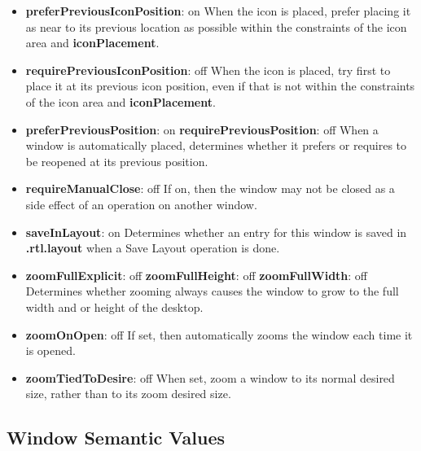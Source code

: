 \begin{itemize}
\item {\bf preferPreviousIconPosition}: on\newline{}
When the icon is placed, prefer placing it as near to its
previous location as possible within the constraints of
the icon area and {\bf iconPlacement}.

\item {\bf requirePreviousIconPosition}: off\newline{}
When the icon is placed, try first to place it at its previous icon
position, even if that is not within the constraints of
the icon area and {\bf iconPlacement}.

\item {\bf preferPreviousPosition}: on\newline{}
{\bf requirePreviousPosition}: off\newline{}
When a window is automatically placed, determines whether it
prefers or requires to be reopened at its previous position.

\item {\bf requireManualClose}: off\newline{}
If on, then the window may not be closed as a side effect of an
operation on another window.

\item {\bf saveInLayout}: on\newline{}
Determines whether an entry for this window is saved in
{\bf .rtl.layout} when a Save Layout operation is done.

\item {\bf zoomFullExplicit}: off\newline{}
{\bf zoomFullHeight}: off\newline{}
{\bf zoomFullWidth}: off\newline{}
Determines whether zooming always causes the window
to grow to the full width and or height of the desktop.

\item {\bf zoomOnOpen}: off\newline{}
If set, then automatically zooms the window each time it is
opened.

\item {\bf zoomTiedToDesire}: off\newline{}
When set, zoom a window to its normal desired size, rather than to its
zoom desired size.

\end{itemize}

\subsection{Window Semantic Values}

